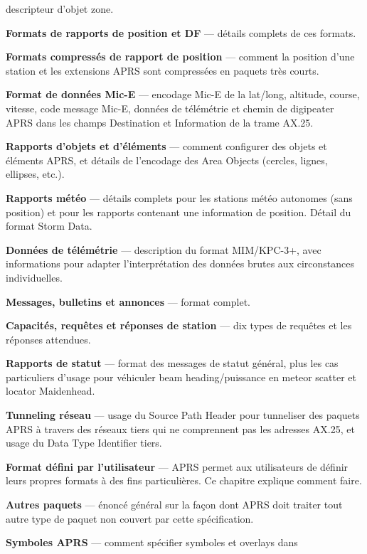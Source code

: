 \begin{aprsbodyblock}
\begin{list}{}{\setlength{\leftmargin}{0pt}\setlength{\rightmargin}{0pt}\setlength{\itemindent}{0pt}\setlength{\labelwidth}{0pt}\setlength{\labelsep}{0pt}\setlength{\itemsep}{0.35em}\setlength{\parsep}{0pt}}
  descripteur d'objet zone.
\item
  \textbf{Formats de rapports de position et DF} --- détails complets de
  ces formats.
\item
  \textbf{Formats compressés de rapport de position} --- comment la
  position d'une station et les extensions APRS sont compressées en
  paquets très courts.
\item
  \textbf{Format de données Mic-E} --- encodage Mic-E de la lat/long,
  altitude, course, vitesse, code message Mic-E, données de télémétrie
  et chemin de digipeater APRS dans les champs Destination et
  Information de la trame AX.25.
\item
  \textbf{Rapports d'objets et d'éléments} --- comment configurer des
  objets et éléments APRS, et détails de l'encodage des Area Objects
  (cercles, lignes, ellipses, etc.).
\item
  \textbf{Rapports météo} --- détails complets pour les stations météo
  autonomes (sans position) et pour les rapports contenant une
  information de position. Détail du format Storm Data.
\item
  \textbf{Données de télémétrie} --- description du format MIM/KPC-3+,
  avec informations pour adapter l'interprétation des données brutes aux
  circonstances individuelles.
\item
  \textbf{Messages, bulletins et annonces} --- format complet.
\item
  \textbf{Capacités, requêtes et réponses de station} --- dix types de
  requêtes et les réponses attendues.
\item
  \textbf{Rapports de statut} --- format des messages de statut général,
  plus les cas particuliers d'usage pour véhiculer beam
  heading/puissance en meteor scatter et locator Maidenhead.
\item
  \textbf{Tunneling réseau} --- usage du Source Path Header pour
  tunneliser des paquets APRS à travers des réseaux tiers qui ne
  comprennent pas les adresses AX.25, et usage du Data Type Identifier
  tiers.
\item
  \textbf{Format défini par l'utilisateur} --- APRS permet aux
  utilisateurs de définir leurs propres formats à des fins
  particulières. Ce chapitre explique comment faire.
\item
  \textbf{Autres paquets} --- énoncé général sur la façon dont APRS doit
  traiter tout autre type de paquet non couvert par cette spécification.
\item
  \textbf{Symboles APRS} --- comment spécifier symboles et overlays dans

\end{list}
\end{aprsbodyblock}
